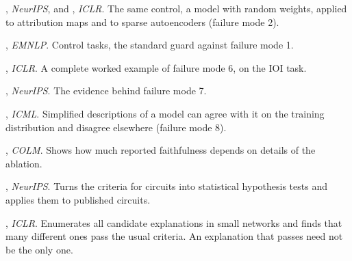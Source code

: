 \begin{readinglist}
\item \citet{adebayo2018sanity}, \emph{NeurIPS}, and \citet{heap2025sparse}, \emph{ICLR}. The same control, a model
with random weights, applied to attribution maps and to sparse autoencoders (failure mode 2).
\item \citet{hewitt2019designing}, \emph{EMNLP}. Control tasks, the standard guard against failure mode 1.
\item \citet{makelov2024subspace}, \emph{ICLR}. A complete worked example of failure mode 6, on the IOI task.
\item \citet{hase2023does}, \emph{NeurIPS}. The evidence behind failure mode 7.
\item \citet{friedman2024interpretability}, \emph{ICML}. Simplified descriptions of a model can agree with it on
the training distribution and disagree elsewhere (failure mode 8).
\item \citet{miller2024transformer}, \emph{COLM}. Shows how much reported faithfulness depends on details of the
ablation.
\item \citet{shi2024hypothesis}, \emph{NeurIPS}. Turns the criteria for circuits into statistical hypothesis
tests and applies them to published circuits.
\item \citet{meloux2025everything}, \emph{ICLR}. Enumerates all candidate explanations in small networks and finds
that many different ones pass the usual criteria. An explanation that passes need not be the only one.
\end{readinglist}
